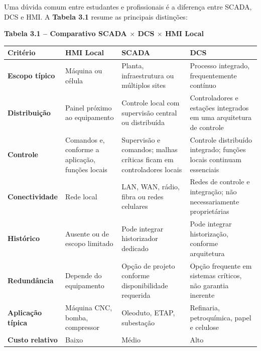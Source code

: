 Uma dúvida comum entre estudantes e profissionais é a diferença entre SCADA, DCS e HMI. A \textbf{Tabela 3.1} resume as principais distinções:

\textbf{Tabela 3.1 -- Comparativo SCADA \ensuremath{\times} DCS \ensuremath{\times} HMI Local}

\begin{longtable}[]{@{}
  >{\raggedright\arraybackslash}p{}
  >{\raggedright\arraybackslash}p{}
  >{\raggedright\arraybackslash}p{}
  >{\raggedright\arraybackslash}p{}@{}}
\toprule\noalign{}
\begin{minipage}[b]{\linewidth}\raggedright
Critério
\end{minipage} & \begin{minipage}[b]{\linewidth}\raggedright
HMI Local
\end{minipage} & \begin{minipage}[b]{\linewidth}\raggedright
SCADA
\end{minipage} & \begin{minipage}[b]{\linewidth}\raggedright
DCS
\end{minipage} \\
\midrule\noalign{}
\endhead
\bottomrule\noalign{}
\endlastfoot
\textbf{Escopo típico} & Máquina ou célula & Planta, infraestrutura ou múltiplos sites & Processo integrado, frequentemente contínuo \\
\textbf{Distribuição} & Painel próximo ao equipamento & Controle local com supervisão central ou distribuída & Controladores e estações integrados em uma arquitetura de controle \\
\textbf{Controle} & Comandos e, conforme a aplicação, funções locais & Supervisão e comandos; malhas críticas ficam em controladores locais & Controle distribuído integrado; funções locais continuam essenciais \\
\textbf{Conectividade} & Rede local & LAN, WAN, rádio, fibra ou redes celulares & Redes de controle e integração; não necessariamente proprietárias \\
\textbf{Histórico} & Ausente ou de escopo limitado & Pode integrar historizador dedicado & Pode integrar historização, conforme arquitetura \\
\textbf{Redundância} & Depende do equipamento & Opção de projeto conforme disponibilidade requerida & Opção frequente em sistemas críticos, não garantia inerente \\
\textbf{Aplicação típica} & Máquina CNC, bomba, compressor & Oleoduto, ETAP, subestação & Refinaria, petroquímica, papel e celulose \\
\textbf{Custo relativo} & Baixo & Médio & Alto \\
\end{longtable}

